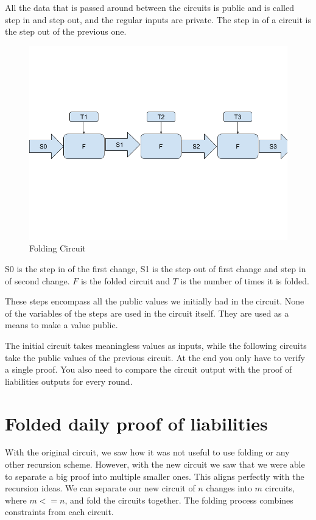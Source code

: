 All the data that is passed around between the circuits is public and is called step in and step out, and the regular inputs are private.
The step in of a circuit is the step out of the previous one.

\begin{figure}[H]
   \centering
   \includegraphics[width=130mm]{FoldingCircuit.png}
   \caption{Folding Circuit}
   \label{overflow}
   \end{figure}

S0 is the step in of the first change, S1 is the step out of first change and step in of second change. $F$ is the folded circuit
and $T$ is the number of times it is folded.

These steps encompass all the public values we initially had in the circuit.
None of the variables of the steps are used in the circuit itself. They are used as a means to make a value public.

The initial circuit takes meaningless values as inputs, while the following circuits take the public values of the previous circuit.
At the end you only have to verify a single proof. You also need to compare the circuit output with the proof of liabilities outputs for every round.

\section{Folded daily proof of liabilities}
With the original circuit, we saw how it was not useful to use folding or any other recursion scheme.
However, with the new circuit we saw that we were able to separate a big proof into multiple smaller ones.
This aligns perfectly with the recursion ideas.
We can separate our new circuit of $n$ changes into $m$ circuits, where $m <= n$, and fold the circuits together. 
The folding process combines constraints from each circuit.

